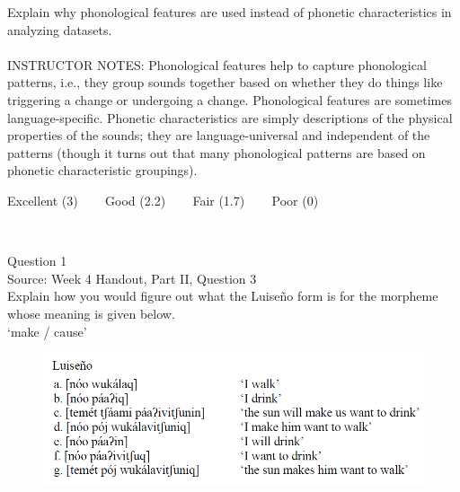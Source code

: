 \documentclass[12pt]{article}
\begin{document}
Explain why phonological features are used instead of phonetic characteristics in analyzing datasets.\\


~\\
INSTRUCTOR NOTES: Phonological features help to capture phonological patterns, i.e., they group sounds together based on whether they do things like triggering a change or undergoing a change. Phonological features are sometimes language-specific. Phonetic characteristics are simply descriptions of the physical properties of the sounds; they are language-universal and independent of the patterns (though it turns out that many phonological patterns are based on phonetic characteristic groupings).


\vfill
Excellent (3) ~~~ Good (2.2) ~~~ Fair (1.7) ~~~ Poor (0)
\newpage

\begin{center}
\textbf{{\color{red}{\HUGE END OF EXAM}}}\\

\end{center}
\newpage

\begin{center}
\textbf{{\color{blue}{\HUGE START OF EXAM\\}}}

\textbf{{\color{blue}{\HUGE Student ID: 51697\\}}}

\textbf{{\color{blue}{\HUGE 9:30\\}}}

\end{center}
\newpage

{\large Question 1}\\

Source: Week 4 Handout, Part II, Question 3\\

Explain how you would figure out what the Luiseño form is for the morpheme whose meaning is given below.\\

‘make / cause’

\begin{figure}[H]
\includegraphics{../images/luiseno.png}
\end{figure}
\end{document}
